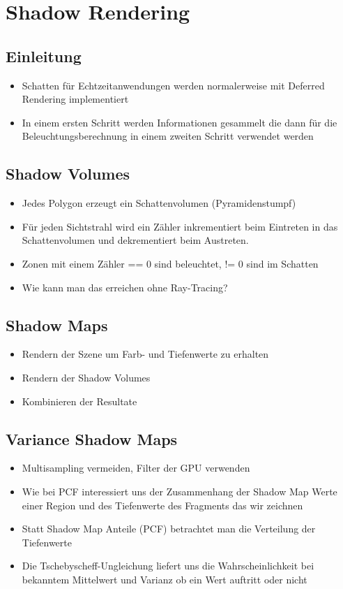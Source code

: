 \documentclass[10pt]{article}
\begin{document}
\newpage
\section{Shadow Rendering}
\subsection{Einleitung}
\begin{itemize}
	\item Schatten für Echtzeitanwendungen werden normalerweise mit Deferred Rendering implementiert
	\item In einem ersten Schritt werden Informationen gesammelt die dann für die Beleuchtungsberechnung in einem zweiten Schritt verwendet werden
\end{itemize}
\subsection{Shadow Volumes}
\begin{itemize}
	\item Jedes Polygon erzeugt ein Schattenvolumen (Pyramidenstumpf)
	\item Für jeden Sichtstrahl wird ein Zähler inkrementiert beim Eintreten in das Schattenvolumen und dekrementiert beim Austreten.
	\item Zonen mit einem Zähler == 0 sind beleuchtet, != 0 sind im Schatten
	\item Wie kann man das erreichen ohne Ray-Tracing?
\end{itemize}
\subsection{Shadow Maps}
\begin{itemize}
	\item Rendern der Szene um Farb- und Tiefenwerte zu erhalten
	\item Rendern der Shadow Volumes
	\item Kombinieren der Resultate
\end{itemize}
\subsection{Variance Shadow Maps}
\begin{itemize}
	\item Multisampling vermeiden, Filter der GPU verwenden
	\item Wie bei PCF interessiert uns der Zusammenhang der Shadow Map Werte einer Region und des Tiefenwerte des Fragments das wir zeichnen
	\item Statt Shadow Map Anteile (PCF) betrachtet man die Verteilung der Tiefenwerte
	\item Die Tschebyscheff-Ungleichung liefert uns die Wahrscheinlichkeit bei bekanntem Mittelwert und Varianz ob ein Wert  auftritt oder nicht
\end{itemize}
\end{document}

